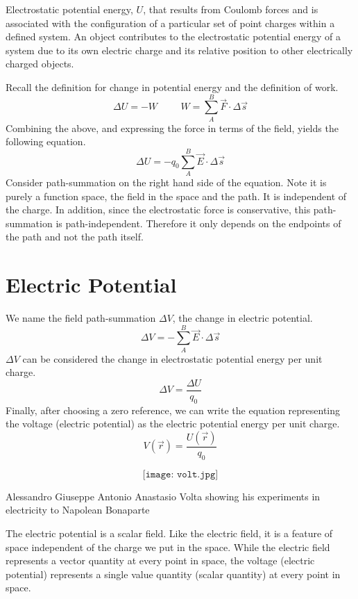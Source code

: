   Electrostatic potential energy, $U$, that results from Coulomb forces and is associated with the configuration of a particular set of point charges within a defined system.  An object contributes to the electrostatic potential energy of a system due to its own electric charge and its relative position to other electrically charged objects.
 
  Recall the definition for change in potential energy and the definition of work.
  $$\Delta U=-W \hspace{1cm} W= \sum_A^B \overrightarrow{F}\cdot \Delta\overrightarrow{s}$$
  Combining the above, and expressing the force in terms of the field, yields the following equation.
  $$\Delta U =- q_0 \sum_A^B \overrightarrow{E}\cdot \Delta\overrightarrow{s}$$
  Consider path-summation on the right hand side of the equation.  Note it is purely a function space, the field in the space and the path.  It is independent of the charge.  In addition, since the electrostatic force is conservative, this path-summation is path-independent.   Therefore it only depends on the endpoints of the path and not the path itself.
  
  \section{Electric Potential}
    \marginnote[0pt]{ }
  We name the field path-summation $\Delta V$, the change in electric potential.
  $$\Delta V=-\sum_A^B \overrightarrow{E}\cdot \Delta \overrightarrow{s}$$
  $\Delta V$ can be considered the change in electrostatic potential energy per unit charge.
  $$\Delta V=\frac{\Delta U}{q_0}$$
  Finally, after choosing a zero reference, we can write the equation representing the voltage (electric potential) as the electric potential energy per unit charge.
  $$V(\overrightarrow{r})=\frac{U(\overrightarrow{r})}{q_0}$$
   \begin{marginfigure}[0pt]%
 $$ \texttt{[image: volt.jpg]}$$
  \caption{Alessandro Giuseppe Antonio Anastasio Volta showing his experiments in electricity to Napolean Bonaparte}
  \label{fig:marginfig}
\end{marginfigure}
  The electric potential is a scalar field.  Like the electric field, it is a feature of space independent of the charge we put in the space.  While the electric field represents a vector quantity at every point in space, the voltage (electric potential) represents a single value quantity (scalar quantity) at every point in space.
  
